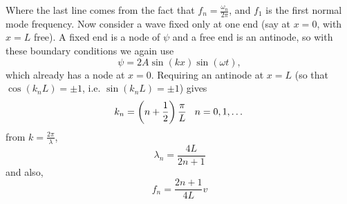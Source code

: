 \documentclass{report}
\numberwithin{equation}{section}
\begin{document}
Where the last line comes from the fact that $f_n = \frac{\omega_n}{2\pi}$, and $f_1$ is the first normal mode frequency. Now consider a wave fixed only at one end (say at $x=0$, with $x=L$ free). A fixed end is a node of $\psi$ and a free end is an antinode, so with these boundary conditions we again use
\begin{equation*}
	\psi = 2A\sin(kx)\sin(\omega t),
\end{equation*}
which already has a node at $x=0$. Requiring an antinode at $x=L$ (so that $\cos(k_nL)=\pm1$, i.e. $\sin(k_nL)=\pm1$) gives
\begin{equation}
	k_n = \left(n+\frac{1}{2}\right)\frac{\pi}{L}\hspace{0.3cm} n=0,1,\dots
\end{equation}
from $k=\frac{2\pi}{\lambda}$,
\begin{equation}
	\lambda_n = \frac{4L}{2n+1}
\end{equation}
and also,
\begin{equation}
	f_n = \frac{2n+1}{4L}v
\end{equation}
\end{document}
